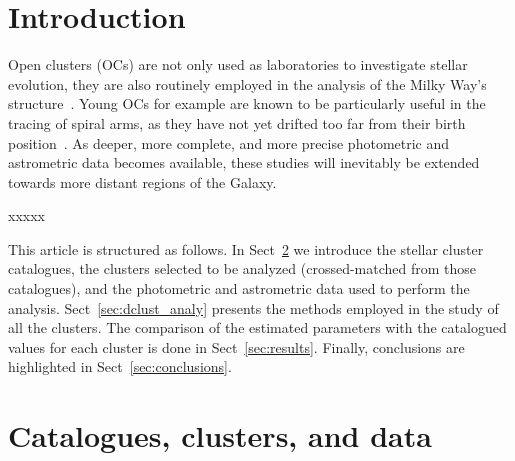 \documentclass{aa}
\begin{document}

\maketitle


\section{Introduction}

 Open clusters (OCs) are not only used as laboratories to investigate stellar
 evolution, they are also routinely employed in the analysis of the Milky Way's
 structure~\citep{Loktin_1992,Moitinho_2006,Vazquez2008,Moitinho_2010}.
 Young OCs for example are known to be particularly
 useful in the tracing of spiral arms, as they have not yet drifted too far
 from their birth position~\citep{carraro_2013,Molina_2018}. As deeper, more
 complete, and more precise photometric and astrometric data becomes available,
 these studies will inevitably be extended towards more distant regions of the
 Galaxy.

 xxxxx

 This article is structured as follows. In Sect~\ref{sec:cat_clust_data} we
 introduce the stellar cluster catalogues, the clusters selected to be
 analyzed (crossed-matched from those catalogues), and the photometric and 
 astrometric data used to perform the analysis. Sect~\ref{sec:dclust_analy}
 presents the methods employed in the study of all the clusters. The comparison
 of the estimated parameters with the catalogued values for each cluster is done
 in Sect~\ref{sec:results}. Finally, conclusions are highlighted in
 Sect~\ref{sec:conclusions}.





\section{Catalogues, clusters, and data}
 \label{sec:cat_clust_data}
\end{document}
